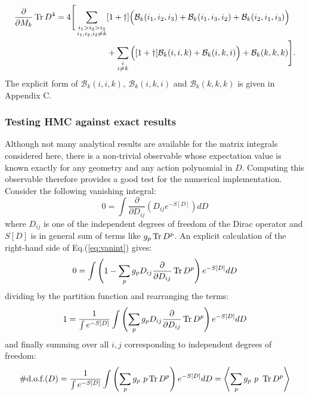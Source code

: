 \begin{align} 
\frac{\partial}{\partial M_k} \operatorname{Tr} D^4 = 4 \Bigg[ \sum_{\substack{i_1 > i_2 > i_3 \\ i_1,i_2,i_3 \neq k}} &[1+\dagger] \Big( \mathcal{B}_k(i_1, i_2, i_3) + \mathcal{B}_k(i_1, i_3, i_2) + \mathcal{B}_k(i_2, i_1, i_3) \Big) \notag \\
&+ \sum_{\substack{i \\ i \neq k}} \Big( [1+\dagger] \mathcal{B}_k(i, i, k) + \mathcal{B}_k(i, k, i) \Big) + \mathcal{B}_k(k,k,k) \Bigg].
\end{align}
The explicit form of $\mathcal{B}_k(i,i,k), \ \mathcal{B}_k(i,k,i)$ and $\mathcal{B}_k(k,k,k)$ is given in Appendix C.

\subsubsection{Testing HMC against exact results}
Although not many analytical results are available for the matrix integrals considered here, there is a non-trivial observable whose expectation value is known exactly for any geometry and any action polynomial in $D$. Computing this observable therefore provides a good test for the numerical implementation.\newline
Consider the following vanishing integral:
\begin{equation} \label{eq:vanint}
0 = \int \frac{\partial}{\partial D_{ij}} \left( D_{ij} e^{-S[D]} \right) d D
\end{equation}
where $D_{ij}$ is one of the independent degrees of freedom of the Dirac operator and $S[D]$ is in general sum of terms like $g_p \operatorname{Tr} D^p$.\newline
An explicit calculation of the right-hand side of Eq.(\ref{eq:vanint}) gives:
\begin{equation}
0 = \int \left( 1 - \sum_p g_p D_{ij} \frac{\partial}{\partial D_{ij}} \operatorname{Tr} D^p \right) e^{-S[D]}d D
\end{equation}
dividing by the partition function and rearranging the terms:
\begin{equation}
1 =\frac{1}{\int e^{-S[D]}} \int \left( \sum_p g_p D_{ij} \frac{\partial}{\partial D_{ij}} \operatorname{Tr} D^p \right) e^{-S[D]}d D
\end{equation}
and finally summing over all $i, j$ corresponding to independent degrees of freedom:
\begin{equation}\label{eq:dofs}
\#\text{d.o.f.}(D) = \frac{1}{\int e^{-S[D]}} \int \left( \sum_p g_p \ p \operatorname{Tr} D^p \right) e^{-S[D]} d D = \left\langle \sum_p g_p \ p \  \operatorname{Tr} D^p \right\rangle
\end{equation}

